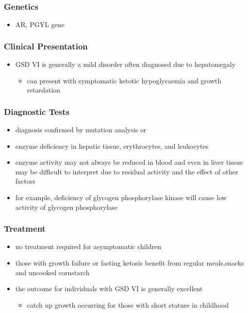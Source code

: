 \documentclass{scrartcl}
\begin{document}
\subsubsection{Genetics}
\label{sec:org4a997de}
\begin{itemize}
\item AR, PGYL gene
\end{itemize}

\subsubsection{Clinical Presentation}
\label{sec:org1a03727}
\begin{itemize}
\item GSD VI is generally a mild disorder often diagnosed due to hepatomegaly
\begin{itemize}
\item can present with symptomatic ketotic hypoglycaemia and growth retardation
\end{itemize}
\end{itemize}
\subsubsection{Diagnostic Tests}
\label{sec:org70d7159}
\begin{itemize}
\item diagnosis confirmed by mutation analysis or
\item enzyme deficiency in hepatic tissue, erythrocytes, and leukocytes
\item enzyme activity may not always be reduced in blood and even in liver
tissue may be difficult to interpret due to residual activity and
the effect of other factors
\item for example, deficiency of glycogen phosphorylase kinase will cause
low activity of glycogen phosphorylase
\end{itemize}
\subsubsection{Treatment}
\label{sec:orgac79c42}
\begin{itemize}
\item no treatment required for asymptomatic children
\item those with growth failure or fasting ketosis benefit from regular
meals,snacks and uncooked cornstarch
\item the outcome for individuals with GSD VI is generally excellent
\begin{itemize}
\item catch up growth occurring for those with short stature in childhood
\end{itemize}
\end{itemize}
\end{document}
